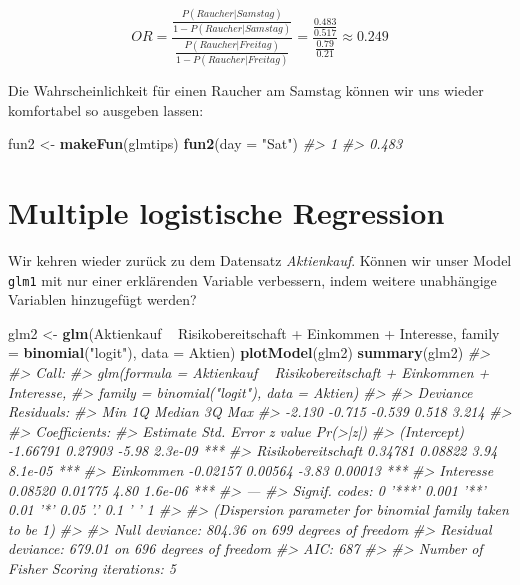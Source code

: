 \documentclass[12pt,]{book}
\makeatletter
\newenvironment{Shaded}{\begin{snugshade}}{\end{snugshade}}
\newcommand{\KeywordTok}[1]{\textcolor[rgb]{0.13,0.29,0.53}{\textbf{{#1}}}}
\newcommand{\DataTypeTok}[1]{\textcolor[rgb]{0.13,0.29,0.53}{{#1}}}
\newcommand{\StringTok}[1]{\textcolor[rgb]{0.31,0.60,0.02}{{#1}}}
\newcommand{\CommentTok}[1]{\textcolor[rgb]{0.56,0.35,0.01}{\textit{{#1}}}}
\newcommand{\NormalTok}[1]{{#1}}
\newenvironment{kframe}{%
\medskip{}
\setlength{\fboxsep}{.8em}
 \def\at@end@of@kframe{}%
 \ifinner\ifhmode%
  \def\at@end@of@kframe{\end{minipage}}%
  \begin{minipage}{\columnwidth}%
 \fi\fi%
 \def\FrameCommand##1{\hskip\@totalleftmargin \hskip-\fboxsep
 \colorbox{shadecolor}{##1}\hskip-\fboxsep
     \hskip-\linewidth \hskip-\@totalleftmargin \hskip\columnwidth}%
 \MakeFramed {\advance\hsize-\width
   \@totalleftmargin\z@ \linewidth\hsize
   \@setminipage}}%
 {\par\unskip\endMakeFramed%
 \at@end@of@kframe}
\renewenvironment{Shaded}{\begin{kframe}}{\end{kframe}}
\makeatother
\begin{document}
\[{OR=\frac{\frac{P(Raucher|Samstag)}{1-P(Raucher|Samstag)}}
{\frac{P(Raucher|Freitag)}{1-P(Raucher|Freitag)}}
=\frac{\frac{0.483}{0.517}}
{\frac{0.79}{0.21}}
\approx 0.249}\]

Die Wahrscheinlichkeit für einen Raucher am Samstag können wir uns
wieder komfortabel so ausgeben lassen:

\begin{Shaded}
\begin{Highlighting}[]
\NormalTok{fun2 <-}\StringTok{ }\KeywordTok{makeFun}\NormalTok{(glmtips)}
\KeywordTok{fun2}\NormalTok{(}\DataTypeTok{day =} \StringTok{"Sat"}\NormalTok{)}
\CommentTok{#>     1 }
\CommentTok{#> 0.483}
\end{Highlighting}
\end{Shaded}

\section{Multiple logistische
Regression}\label{multiple-logistische-regression}

Wir kehren wieder zurück zu dem Datensatz \emph{Aktienkauf}. Können wir
unser Model \texttt{glm1} mit nur einer erklärenden Variable verbessern,
indem weitere unabhängige Variablen hinzugefügt werden?

\begin{Shaded}
\begin{Highlighting}[]
\NormalTok{glm2 <-}\StringTok{ }\KeywordTok{glm}\NormalTok{(Aktienkauf ~}\StringTok{ }\NormalTok{Risikobereitschaft +}\StringTok{ }\NormalTok{Einkommen +}\StringTok{ }\NormalTok{Interesse, }
            \DataTypeTok{family =} \KeywordTok{binomial}\NormalTok{(}\StringTok{"logit"}\NormalTok{), }\DataTypeTok{data =} \NormalTok{Aktien)}
\KeywordTok{plotModel}\NormalTok{(glm2)}
\KeywordTok{summary}\NormalTok{(glm2)}
\CommentTok{#> }
\CommentTok{#> Call:}
\CommentTok{#> glm(formula = Aktienkauf ~ Risikobereitschaft + Einkommen + Interesse, }
\CommentTok{#>     family = binomial("logit"), data = Aktien)}
\CommentTok{#> }
\CommentTok{#> Deviance Residuals: }
\CommentTok{#>    Min      1Q  Median      3Q     Max  }
\CommentTok{#> -2.130  -0.715  -0.539   0.518   3.214  }
\CommentTok{#> }
\CommentTok{#> Coefficients:}
\CommentTok{#>                    Estimate Std. Error z value Pr(>|z|)    }
\CommentTok{#> (Intercept)        -1.66791    0.27903   -5.98  2.3e-09 ***}
\CommentTok{#> Risikobereitschaft  0.34781    0.08822    3.94  8.1e-05 ***}
\CommentTok{#> Einkommen          -0.02157    0.00564   -3.83  0.00013 ***}
\CommentTok{#> Interesse           0.08520    0.01775    4.80  1.6e-06 ***}
\CommentTok{#> ---}
\CommentTok{#> Signif. codes:  0 '***' 0.001 '**' 0.01 '*' 0.05 '.' 0.1 ' ' 1}
\CommentTok{#> }
\CommentTok{#> (Dispersion parameter for binomial family taken to be 1)}
\CommentTok{#> }
\CommentTok{#>     Null deviance: 804.36  on 699  degrees of freedom}
\CommentTok{#> Residual deviance: 679.01  on 696  degrees of freedom}
\CommentTok{#> AIC: 687}
\CommentTok{#> }
\CommentTok{#> Number of Fisher Scoring iterations: 5}
\end{Highlighting}
\end{Shaded}
\end{document}

